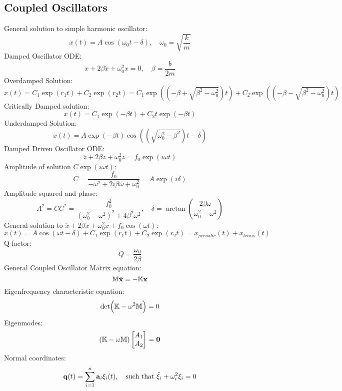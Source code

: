 \subsection{Coupled Oscillators}
General solution to simple harmonic oscillator:
\begin{equation}
    x(t) = A\cos(\omega_0 t - \delta), \quad \omega_0 = \sqrt{\frac{k}{m}}
\end{equation}
Damped Oscillator ODE:
\begin{equation}
    \ddot{x} + 2\beta\dot{x} + \omega_0^2x = 0, \quad \beta = \frac{b}{2m}
\end{equation}
Overdamped Solution:
\begin{equation}
    x(t) = C_1\exp(r_1t) + C_2\exp(r_2t) = C_1\exp(\left(-\beta + \sqrt{\beta^2 - \omega_0^2}\right)t) + C_2\exp(\left(-\beta - \sqrt{\beta^2 - \omega_0^2}\right)t)
\end{equation}
Critically Damped solution:
\begin{equation}
    x(t) = C_1\exp(-\beta t) + C_2t\exp(-\beta t)
\end{equation}
Underdamped Solution:
\begin{equation}
    x(t) = A\exp(-\beta t)\cos(\left(\sqrt{\omega_0^2 - \beta^2}\right)t - \delta)
\end{equation}
Damped Driven Oscillator ODE:
\begin{equation}
    \ddot{z} + 2\beta\dot{z} + \omega_0^2z = f_0\exp(i\omega t)
\end{equation}
Amplitude of solution $C\exp(i\omega t)$:
\begin{equation}
    C = \frac{f_0}{-\omega^2 + 2i\beta \omega + \omega_0^2} = A\exp(i\delta)
\end{equation}
Amplitude squared and phase:
\begin{equation}
    A^2 = CC^* = \frac{f_0^2}{(\omega_0^2 - \omega^2)^2 + 4\beta^2\omega^2}, \quad \delta = \arctan(\frac{2\beta \omega}{\omega_0^2 - \omega^2})
\end{equation}
General solution to $\ddot{x} + 2\beta\dot{x} + \omega_0^2x + f_0\cos(\omega t)$:
\begin{equation}
    x(t) = A\cos(\omega t - \delta) + C_1\exp(r_1 t) + C_2\exp(r_2t) = x_{periodic}(t) + x_{trans}(t)
\end{equation}
Q factor:
\begin{equation}
    Q = \frac{\omega_0}{2\beta}
\end{equation}
General Coupled Oscillator Matrix equation:
\begin{equation}
    \mathbb{M}\ddot{\mathbf{x}} = -\mathbb{K}\mathbf{x}
\end{equation}
Eigenfrequency characteristic equation:
\begin{equation}
    \det(\mathbb{K} - \omega^2\mathbb{M}) = 0
\end{equation}
Eigenmodes:
\begin{equation}
    (\mathbb{K} - \omega\mathbb{M})\begin{bmatrix}A_1 \\A_2\end{bmatrix} = \mathbf{0}
\end{equation}
Normal coordinates:
\begin{equation}
    \mathbf{q}(t) = \sum_{i=1}^n\mathbf{a}_i\xi_i(t), \quad \text{such that } \ddot{\xi}_i + \omega_i^2\xi_i = 0
\end{equation}
